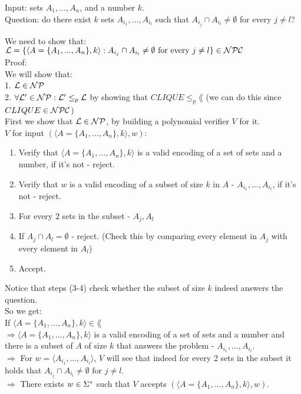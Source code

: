 
Input: sets $A_1, ..., A_n$, and a number $k$. \\
Question: do there exist $k$ sets $A_{i_1} , ..., A_{i_l}$ such that $A_{i_j} \cap A_{i_l} \neq \emptyset$ for
every $j \neq l$?

We need to show that: \\
$\mathcal{L} = \{\langle A = \{A_1, ..., A_n\}, k \rangle:  A_{i_j} \cap A_{i_l} \neq \emptyset \text{ for
        every } j \neq l\} \in \mathcal{N}\mathcal{P}\mathcal{C}$ \\

Proof: \\
We will show that: \\
1. $\mathcal{L} \in \mathcal{N}\mathcal{P}$ \\
2. $\forall \mathcal{L}' \in \mathcal{N}\mathcal{P}: \mathcal{L}' \leq_p \mathcal{L}$ by showing that $CLIQUE \leq_p \lang$ (we can do this since $CLIQUE \in \mathcal{N}\mathcal{P}\mathcal{C}$) \\

First we show that $\mathcal{L} \in \mathcal{N}\mathcal{P}$, by building a polynomial verifier $V$ for it. \\
$V$ for input $(\langle A = \{A_1, ..., A_n\}, k \rangle, w)$:
\begin{enumerate}[1., itemsep=5pt]
    \item Verify that $\langle A = \{A_1, ..., A_n\}, k \rangle$ is a valid encoding of a set of sets and a number, if it's not - reject.
    \item Verify that $w$ is a valid encoding of a subset of size $k$ in $A$ - $A_{i_1} , ..., A_{i_l}$, if it's not - reject.

    \item For every 2 sets in the subset - $A_j, A_l$
    \item \qquad If $A_j \cap A_l = \emptyset$ - reject. (Check this by comparing every element in $A_j$ with every element in $A_l$)

    \item Accept.

\end{enumerate}

Notice that steps (3-4) check whether the subset of size $k$ indeed answers the question. \\

So we get: \\
If $\langle A = \{A_1, ..., A_n\}, k \rangle \in \lang$ \\
$\Rightarrow \langle A = \{A_1, ..., A_n\}, k \rangle$ is a valid encoding of a set of sets and a number
and there is a subset of $A$ of size $k$ that answers the problem - $A_{i_1} , ..., A_{i_l}$.\\
$\Rightarrow $ For $w=\langle A_{i_1} , ..., A_{i_l} \rangle$, $V$ will see that indeed for every 2 sets in the
subset it holds that $A_{i_j} \cap A_{i_l} \neq \emptyset \text{ for } j \neq l$. \\
$\Rightarrow $ There exists $w \in \Sigma^*$ such that $V$ accepts $(\langle A = \{A_1, ..., A_n\}, k \rangle, w)$. \\

